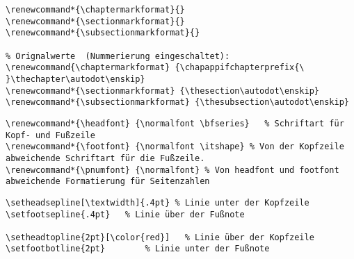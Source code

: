 \label{cha:KapNumAus}
\negAbstand
\begin{lstlisting}
\renewcommand*{\chaptermarkformat}{} 
\renewcommand*{\sectionmarkformat}{}
\renewcommand*{\subsectionmarkformat}{}

% Orignalwerte  (Nummerierung eingeschaltet): 
\renewcommand{\chaptermarkformat} {\chapappifchapterprefix{\ }\thechapter\autodot\enskip}
\renewcommand*{\sectionmarkformat} {\thesection\autodot\enskip}
\renewcommand*{\subsectionmarkformat} {\thesubsection\autodot\enskip}
\end{lstlisting}

\negAbstand
\begin{lstlisting}
\renewcommand*{\headfont} {\normalfont \bfseries}	% Schriftart für Kopf- und Fußzeile
\renewcommand*{\footfont} {\normalfont \itshape} % Von der Kopfzeile abweichende Schriftart für die Fußzeile.
\renewcommand*{\pnumfont} {\normalfont} % Von headfont und footfont abweichende Formatierung für Seitenzahlen
\end{lstlisting}

\setlength{\columnseprule}{0.5pt}
\negAbstand
\begin{lstlisting}
\setheadsepline[\textwidth]{.4pt} % Linie unter der Kopfzeile
\setfootsepline{.4pt} 	% Linie über der Fußnote

\setheadtopline{2pt}[\color{red}]	% Linie über der Kopfzeile
\setfootbotline{2pt}		% Linie unter der Fußnote
\end{lstlisting}

\bigskip
\myhrule
\bigskip